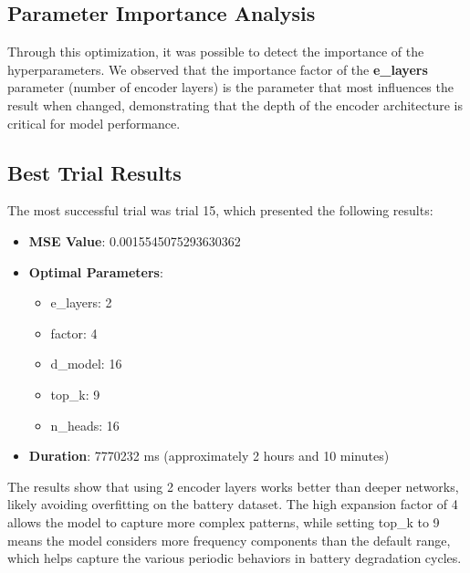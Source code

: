 \subsection{Parameter Importance Analysis}

Through this optimization, it was possible to detect the importance of the hyperparameters. We observed that the importance factor of the \textbf{e\_layers} parameter (number of encoder layers) is the parameter that most influences the result when changed, demonstrating that the depth of the encoder architecture is critical for model performance.

\subsection{Best Trial Results}

The most successful trial was trial 15, which presented the following results:

\begin{itemize}
    \item \textbf{MSE Value}: 0.0015545075293630362
    \item \textbf{Optimal Parameters}:
    \begin{itemize}
        \item e\_layers: 2
        \item factor: 4  
        \item d\_model: 16
        \item top\_k: 9
        \item n\_heads: 16
    \end{itemize}
    \item \textbf{Duration}: 7770232 ms (approximately 2 hours and 10 minutes)
\end{itemize}

The results show that using 2 encoder layers works better than deeper networks, likely avoiding overfitting on the battery dataset. The high expansion factor of 4 allows the model to capture more complex patterns, while setting top\_k to 9 means the model considers more frequency components than the default range, which helps capture the various periodic behaviors in battery degradation cycles.
